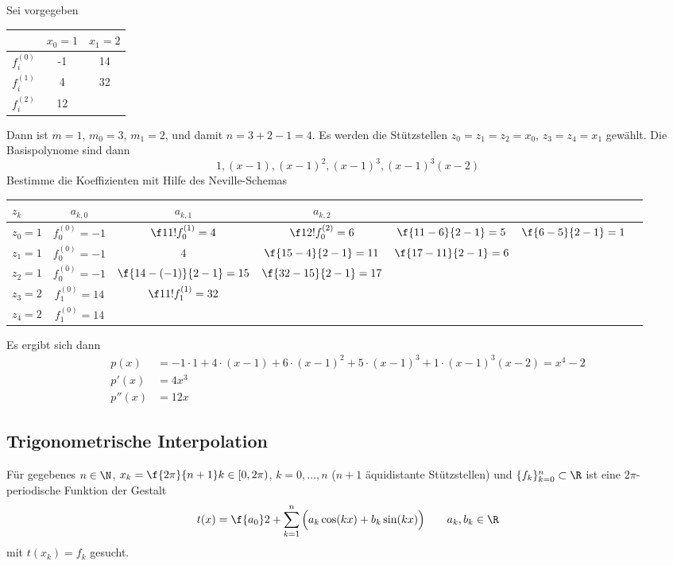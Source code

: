\documentclass[a4paper,11pt]{scrartcl}
\begin{document}
\begin{ex*}
	Sei vorgegeben

	\begin{table}[h]
		\centering	
		\begin{tabular}{l|c|c}
			 & $x_0=1$ & $x_1 =2$ \\ \hline
			$f_i^{(0)}$ & -1 & 14 \\
			$f_i^{(1)}$ & 4 & 32 \\
			$f_i^{(2)}$ & 12 & 
		\end{tabular}		
	\end{table}

	Dann ist $m=1$, $m_0=3$, $m_1=2$, und damit $n=3+2-1=4$.
	Es werden die Stützstellen $z_0=z_1=z_2=x_0$, $z_3=z_4=x_1$ gewählt.
	Die Basispolynome sind dann
	\[
		1, (x-1), (x-1)^2, (x-1)^3, (x-1)^3(x-2)
	\]
	Bestimme die Koeffizienten mit Hilfe des Neville-Schemas

	\begin{table}[h]
		\centering	
		\begin{tabular}{l|c|c|c|c|c|c}
			$z_k$  & $a_{k,0}$ & $a_{k,1}$ & $a_{k,2}$ \\ \hline
			$z_0=1$ & $f_0^{(0)} = -1$  & $\f 1{1!}f_0^{(1)} = 4$ & $\f 1{2!} f_0^{(2)} = 6$ & $\f {11-6}{2-1}=5$ & $\f {6-5}{2-1}=1$ \\
			$z_1=1$ & $f_0^{(0)} = -1$ & $4$ 						&	$\f {15-4}{2-1} = 11$ & $\f {17-11}{2-1}=6$ \\
			$z_2=1$ & $f_0^{(0)} = -1$ & $\f {14-(-1)}{2-1} = 15$ & $\f {32-15}{2-1} = 17$ \\
			$z_3=2$ & $f_1^{(0)} = 14$ & $\f 1 {1!} f_1^{(1)} = 32$ &  \\
			$z_4=2$ & $f_1^{(0)} = 14$ & 
		\end{tabular}		
	\end{table}
	Es ergibt sich dann
	\begin{align*}
		p(x)& = -1\cdot 1 + 4\cdot (x-1) + 6\cdot(x-1)^2 + 5\cdot(x-1)^3 + 1\cdot(x-1)^3 (x-2) = x^4-2\\
		p'(x) &= 4x^3\\
		p''(x) &= 12x
	\end{align*}
\end{ex*}


\subsection{Trigonometrische Interpolation}

Für gegebenes $n\in \N$, $x_k = \f {2\pi}{n+1}k \in [0,2\pi)$, $k=0,\dotsc,n$ ($n+1$ äquidistante Stützstellen) und $\{f_k\}_{k=0}^n\subset \R$ ist eine $2\pi$-periodische Funktion der Gestalt
\[
	t(x) = \f {a_0}2 + \sum_{k=1}^n \Big(a_k \cos(kx) + b_k \sin(kx) \Big) \qquad a_k,b_k \in \R
\]
mit $t(x_k)=f_k$ gesucht.
\end{document}
